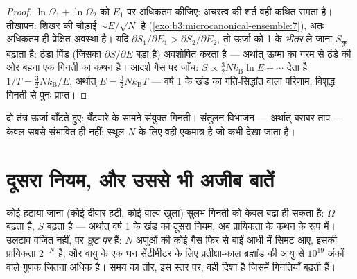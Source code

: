 \begin{proof}
$\ln\Omega_1 + \ln\Omega_2$ को $E_1$ पर अधिकतम कीजिए: अचरत्व की
शर्त वही कथित समता है। तीखापन: शिखर की चौड़ाई
$\sim E/\sqrt N$ है (\cref{exo:b3:microcanonical-ensemble:7}), अतः
अधिकतम ही प्रेक्षित अवस्था है। यदि $\partial S_1/\partial E_1 >
\partial S_2/\partial E_2$, तो ऊर्जा को 1 के \emph{भीतर} ले जाना
$S_{\text{कु}}$ बढ़ाता है: ठंडा पिंड (जिसका $\partial S/\partial E$
बड़ा है) अवशोषित करता है --- अर्थात् ऊष्मा का गरम से ठंडे की ओर बहना
एक गिनती का कथन है। आदर्श गैस पर जाँच: $S \propto \tfrac32 Nk_{\text{B}}\ln E + \cdots$
देता है $1/T = \tfrac32 Nk_{\text{B}}/E$, अर्थात् $E = \tfrac32
Nk_{\text{B}}T$ --- वर्ष 1 के खंड का गति-सिद्धांत वाला परिणाम,
विशुद्ध गिनती से पुनः प्राप्त।
\end{proof}

\begin{omfigure}

{\small दो तंत्र ऊर्जा बाँटते हुए: बँटवारे के सामने संयुक्त गिनती।
संतुलन-विभाजन --- अर्थात् बराबर ताप --- केवल सबसे संभावित ही नहीं;
स्थूल $N$ के लिए वही एकमात्र है जो कभी देखा जाता है।}
\end{omfigure}

\section{दूसरा नियम, और उससे भी अजीब बातें}

\begin{proposition}\label{prop:b3:microcanonical-ensemble:second-law}
कोई  हटाया जाना (कोई दीवार हटी, कोई वाल्व खुला) सुलभ गिनती
को केवल बढ़ा ही सकता है: $\Omega$ बढ़ता है, $S$ बढ़ता है --- अर्थात्
वर्ष 1 के खंड का दूसरा नियम, अब प्रायिकता के कथन के रूप में।
उलटाव वर्जित नहीं, पर \emph{छूट पर} हैं: $N$ अणुओं की कोई गैस फिर से
बाईं आधी में सिमट आए, इसकी प्रायिकता
$2^{-N}$ है, और वायु के एक घन सेंटीमीटर के लिए प्रतीक्षा-काल
ब्रह्मांड की आयु से $10^{19}$ अंकों वाले गुणक जितना अधिक है।
समय का तीर, इस स्तर पर, वही दिशा है जिसमें गिनतियाँ बढ़ती हैं।
\end{proposition}

